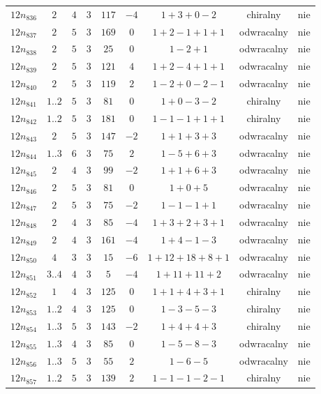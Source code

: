 \begin{longtable}{ccccccccc}
$12n_{836}$ & $2$ & $4$ & $3$ & $117$ & $-4$ & $1+3+0-2$ & chiralny & nie \\
$12n_{837}$ & $2$ & $5$ & $3$ & $169$ & $0$ & $1+2-1+1+1$ & odwracalny & nie \\
$12n_{838}$ & $2$ & $5$ & $3$ & $25$ & $0$ & $1-2+1$ & odwracalny & nie \\
$12n_{839}$ & $2$ & $5$ & $3$ & $121$ & $4$ & $1+2-4+1+1$ & odwracalny & nie \\
$12n_{840}$ & $2$ & $5$ & $3$ & $119$ & $2$ & $1-2+0-2-1$ & odwracalny & nie \\
$12n_{841}$ & $1..2$ & $5$ & $3$ & $81$ & $0$ & $1+0-3-2$ & chiralny & nie \\
$12n_{842}$ & $1..2$ & $5$ & $3$ & $181$ & $0$ & $1-1-1+1+1$ & chiralny & nie \\
$12n_{843}$ & $2$ & $5$ & $3$ & $147$ & $-2$ & $1+1+3+3$ & odwracalny & nie \\
$12n_{844}$ & $1..3$ & $6$ & $3$ & $75$ & $2$ & $1-5+6+3$ & odwracalny & nie \\
$12n_{845}$ & $2$ & $4$ & $3$ & $99$ & $-2$ & $1+1+6+3$ & odwracalny & nie \\
$12n_{846}$ & $2$ & $5$ & $3$ & $81$ & $0$ & $1+0+5$ & odwracalny & nie \\
$12n_{847}$ & $2$ & $5$ & $3$ & $75$ & $-2$ & $1-1-1+1$ & odwracalny & nie \\
$12n_{848}$ & $2$ & $4$ & $3$ & $85$ & $-4$ & $1+3+2+3+1$ & odwracalny & nie \\
$12n_{849}$ & $2$ & $4$ & $3$ & $161$ & $-4$ & $1+4-1-3$ & odwracalny & nie \\
$12n_{850}$ & $4$ & $3$ & $3$ & $15$ & $-6$ & $1+12+18+8+1$ & odwracalny & nie \\
$12n_{851}$ & $3..4$ & $4$ & $3$ & $5$ & $-4$ & $1+11+11+2$ & odwracalny & nie \\
$12n_{852}$ & $1$ & $4$ & $3$ & $125$ & $0$ & $1+1+4+3+1$ & chiralny & nie \\
$12n_{853}$ & $1..2$ & $4$ & $3$ & $125$ & $0$ & $1-3-5-3$ & chiralny & nie \\
$12n_{854}$ & $1..3$ & $5$ & $3$ & $143$ & $-2$ & $1+4+4+3$ & chiralny & nie \\
$12n_{855}$ & $1..3$ & $4$ & $3$ & $85$ & $0$ & $1-5-8-3$ & odwracalny & nie \\
$12n_{856}$ & $1..3$ & $5$ & $3$ & $55$ & $2$ & $1-6-5$ & odwracalny & nie \\
$12n_{857}$ & $1..2$ & $5$ & $3$ & $139$ & $2$ & $1-1-1-2-1$ & chiralny & nie \\

\end{longtable}
